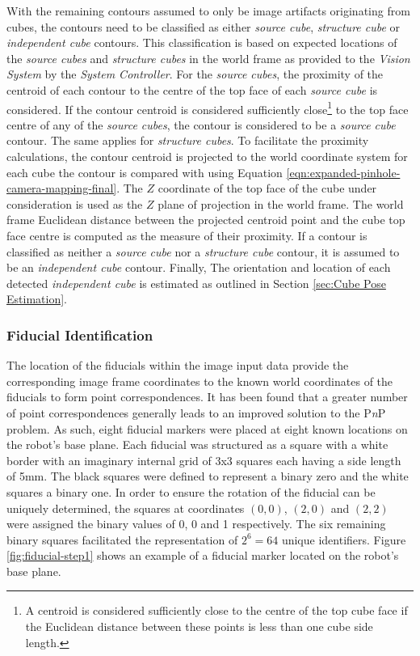 With the remaining contours assumed to only be image artifacts originating from cubes, the contours need to be classified as either \textit{source cube}, \textit{structure cube} or \textit{independent cube} contours. This classification is based on expected locations of the \textit{source cubes} and \textit{structure cubes} in the world frame as provided to the \textit{Vision System} by the \textit{System Controller}. For the \textit{source cubes}, the proximity of the centroid of each contour to the centre of the top face of each \textit{source cube} is considered. If the contour centroid is considered sufficiently close\footnote{A centroid is considered sufficiently close to the centre of the top cube face if the Euclidean distance between these points is less than one cube side length.} to the top face centre of any of the \textit{source cubes}, the contour is considered to be a \textit{source cube} contour. The same applies for \textit{structure cubes}. To facilitate the proximity calculations, the contour centroid is projected to the world coordinate system for each cube the contour is compared with using Equation \ref{eqn:expanded-pinhole-camera-mapping-final}. The $Z$ coordinate of the top face of the cube under consideration is used as the $Z$ plane of projection in the world frame. The world frame Euclidean distance between the projected centroid point and the cube top face centre is computed as the measure of their proximity. If a contour is classified as neither a \textit{source cube} nor a \textit{structure cube} contour, it is assumed to be an \textit{independent cube} contour. Finally, The orientation and location of each detected \textit{independent cube} is estimated as outlined in Section \ref{sec:Cube Pose Estimation}.


\subsubsection{Fiducial Identification} \label{sec:Fiducial Identification}

The location of the fiducials within the image input data provide the corresponding image frame coordinates to the known world coordinates of the fiducials to form point correspondences. It has been found that a greater number of point correspondences generally leads to an improved solution to the P\textit{n}P problem. As such, eight fiducial markers were placed at eight known locations on the robot's base plane. Each fiducial was structured as a square with a white border with an imaginary internal grid of 3x3 squares each having a side length of 5mm. The black squares were defined to represent a binary zero and the white squares a binary one. In order to ensure the rotation of the fiducial can be uniquely determined, the squares at coordinates $(0, 0)$, $(2, 0)$ and $(2,2)$ were assigned the binary values of 0, 0 and 1 respectively. The six remaining binary squares facilitated the representation of $2^6=64$ unique identifiers. Figure \ref{fig:fiducial-step1} shows an example of a fiducial marker located on the robot's base plane. 

